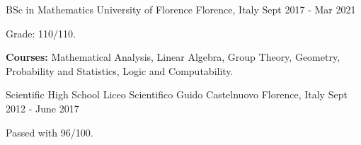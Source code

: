 \begin{cventries}
  \cventry
    {BSc in Mathematics} %
    {University of Florence} %
    {Florence, Italy} %
    {Sept 2017 - Mar 2021} %
    {
      \begin{cvitems} %
        \item {Grade: 110/110.}
        \item {\textbf{Courses:} Mathematical Analysis, Linear Algebra, Group Theory, Geometry, Probability and Statistics, Logic and Computability.}
      \end{cvitems}
    }
    
  \cventry
    {Scientific High School} %
    {Liceo Scientifico Guido Castelnuovo} %
    {Florence, Italy} %
    {Sept 2012 - June 2017} %
    {
      \begin{cvitems} %
        \item {Passed with 96/100.}
      \end{cvitems}
    }
\end{cventries}
